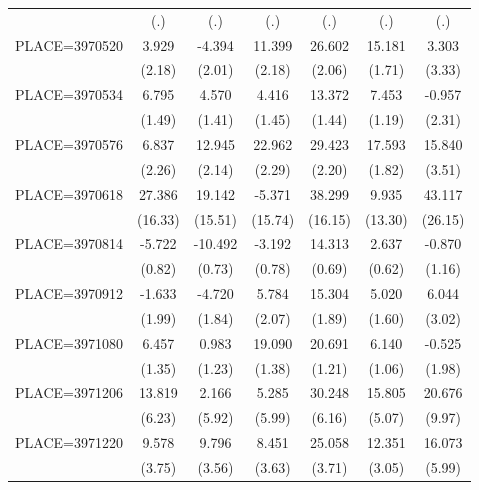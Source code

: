 {\begin{tabular}{l*{6}{c}}
                    &         (.)&         (.)&         (.)&         (.)&         (.)&         (.)\\
PLACE=3970520       &       3.929&      -4.394&      11.399&      26.602&      15.181&       3.303\\
                    &      (2.18)&      (2.01)&      (2.18)&      (2.06)&      (1.71)&      (3.33)\\
PLACE=3970534       &       6.795&       4.570&       4.416&      13.372&       7.453&      -0.957\\
                    &      (1.49)&      (1.41)&      (1.45)&      (1.44)&      (1.19)&      (2.31)\\
PLACE=3970576       &       6.837&      12.945&      22.962&      29.423&      17.593&      15.840\\
                    &      (2.26)&      (2.14)&      (2.29)&      (2.20)&      (1.82)&      (3.51)\\
PLACE=3970618       &      27.386&      19.142&      -5.371&      38.299&       9.935&      43.117\\
                    &     (16.33)&     (15.51)&     (15.74)&     (16.15)&     (13.30)&     (26.15)\\
PLACE=3970814       &      -5.722&     -10.492&      -3.192&      14.313&       2.637&      -0.870\\
                    &      (0.82)&      (0.73)&      (0.78)&      (0.69)&      (0.62)&      (1.16)\\
PLACE=3970912       &      -1.633&      -4.720&       5.784&      15.304&       5.020&       6.044\\
                    &      (1.99)&      (1.84)&      (2.07)&      (1.89)&      (1.60)&      (3.02)\\
PLACE=3971080       &       6.457&       0.983&      19.090&      20.691&       6.140&      -0.525\\
                    &      (1.35)&      (1.23)&      (1.38)&      (1.21)&      (1.06)&      (1.98)\\
PLACE=3971206       &      13.819&       2.166&       5.285&      30.248&      15.805&      20.676\\
                    &      (6.23)&      (5.92)&      (5.99)&      (6.16)&      (5.07)&      (9.97)\\
PLACE=3971220       &       9.578&       9.796&       8.451&      25.058&      12.351&      16.073\\
                    &      (3.75)&      (3.56)&      (3.63)&      (3.71)&      (3.05)&      (5.99)\\

\end{tabular}}
